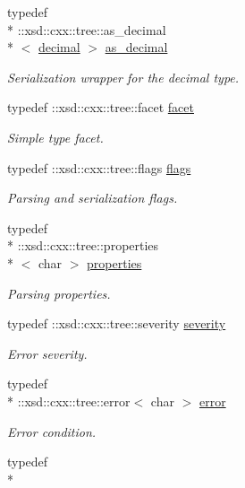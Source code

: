 \begin{DoxyCompactItemize}
typedef \\*
\-::xsd\-::cxx\-::tree\-::as\-\_\-decimal\\*
$<$ \hyperlink{namespacexml__schema_a69bfaf24f63a8c18ebd8e21db6b343df}{decimal} $>$ \hyperlink{namespacexml__schema_a60dfdca63dedf12d8a524c0496def693}{as\-\_\-decimal}
\begin{DoxyCompactList}\small\item\em Serialization wrapper for the decimal type. \end{DoxyCompactList}\item 
typedef \-::xsd\-::cxx\-::tree\-::facet \hyperlink{namespacexml__schema_ae447ddf0dd2470b5a095774e0b359a86}{facet}
\begin{DoxyCompactList}\small\item\em Simple type facet. \end{DoxyCompactList}\item 
typedef \-::xsd\-::cxx\-::tree\-::flags \hyperlink{namespacexml__schema_a0612287d030cb2732d31a45b258fdc87}{flags}
\begin{DoxyCompactList}\small\item\em Parsing and serialization flags. \end{DoxyCompactList}\item 
typedef \\*
\-::xsd\-::cxx\-::tree\-::properties\\*
$<$ char $>$ \hyperlink{namespacexml__schema_a1a8ebac679580b41baebd62c7d641c1d}{properties}
\begin{DoxyCompactList}\small\item\em Parsing properties. \end{DoxyCompactList}\item 
typedef \-::xsd\-::cxx\-::tree\-::severity \hyperlink{namespacexml__schema_a7d2d246dda9239f18f1866a1cdb4022e}{severity}
\begin{DoxyCompactList}\small\item\em Error severity. \end{DoxyCompactList}\item 
typedef \\*
\-::xsd\-::cxx\-::tree\-::error$<$ char $>$ \hyperlink{namespacexml__schema_a25204746dcf5a00a92e68d214a894b84}{error}
\begin{DoxyCompactList}\small\item\em Error condition. \end{DoxyCompactList}\item 
typedef \\*

\end{DoxyCompactItemize}
